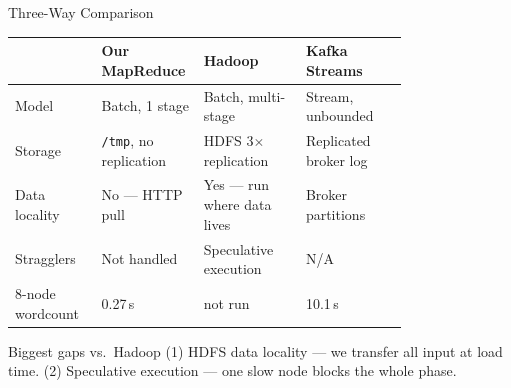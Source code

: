 \documentclass[aspectratio=169,10pt]{beamer}
\begin{document}
\begin{frame}{Three-Way Comparison}
  \begin{table}
    \small
    \begin{tabular}{l p{0.26\linewidth} p{0.26\linewidth} p{0.26\linewidth}}
      \toprule
       & \textbf{Our MapReduce} & \textbf{Hadoop} & \textbf{Kafka Streams} \\
      \midrule
      Model & Batch, 1 stage & Batch, multi-stage & Stream, unbounded \\
      Storage & \texttt{/tmp}, no replication & HDFS 3$\times$ replication & Replicated broker log \\
      Data locality & No — HTTP pull & Yes — run where data lives & Broker partitions \\
      Stragglers & Not handled & Speculative execution & N/A \\
      8-node wordcount & 0.27\,s & not run & 10.1\,s \\
      \bottomrule
    \end{tabular}
  \end{table}
  \begin{block}{Biggest gaps vs.\ Hadoop}
    (1) HDFS data locality — we transfer all input at load time.
    (2) Speculative execution — one slow node blocks the whole phase.
  \end{block}
\end{frame}
\end{document}

